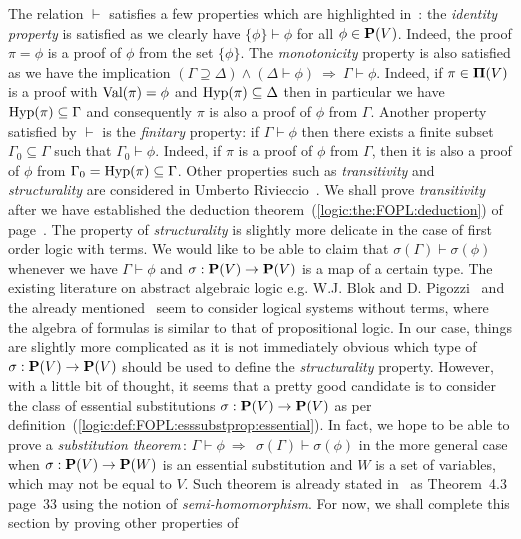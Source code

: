 The relation $\vdash$ satisfies a few properties which are
highlighted in~\cite{Rivieccio}: the {\em identity property} is
satisfied as we clearly have $\{\phi\}\vdash\phi$ for all
$\phi\in\mbox{${\bf P}(V)$}$. Indeed, the proof $\pi=\phi$ is a proof of $\phi$ from
the set $\{\phi\}$. The {\em monotonicity} property is also
satisfied as we have the implication
$(\Gamma\supseteq\Delta)\land(\Delta\vdash\phi)\ \Rightarrow\
\Gamma\vdash\phi$. Indeed, if $\pi\in\mbox{${\bf\Pi}(V)$}$ is a proof with
$\mbox{\rm Val}(\pi)=\phi$ and $\mbox{\rm Hyp}(\pi)\subseteq\Delta$ then in particular
we have $\mbox{\rm Hyp}(\pi)\subseteq\Gamma$ and consequently $\pi$ is also a
proof of $\phi$ from $\Gamma$. Another property satisfied by
$\vdash$ is the {\em finitary} property: if $\Gamma\vdash\phi$ then
there exists a finite subset $\Gamma_{0}\subseteq\Gamma$ such that
$\Gamma_{0}\vdash\phi$. Indeed, if $\pi$ is a proof of $\phi$ from
$\Gamma$, then it is also a proof of $\phi$ from
$\Gamma_{0}=\mbox{\rm Hyp}(\pi)\subseteq\Gamma$. Other properties such as {\em
transitivity} and {\em structurality} are considered in Umberto
Rivieccio~\cite{Rivieccio}. We shall prove {\em transitivity} after
we have established the deduction
theorem~(\ref{logic:the:FOPL:deduction}) of
page~\pageref{logic:the:FOPL:deduction}. The property of {\em
structurality} is slightly more delicate in the case of first order
logic with terms. We would like to be able to claim that
$\sigma(\Gamma)\vdash\sigma(\phi)$ whenever we have
$\Gamma\vdash\phi$ and $\sigma:\mbox{${\bf P}(V)$}\to\mbox{${\bf P}(V)$}$ is a map of a certain
type. The existing literature on abstract algebraic logic e.g. W.J.
Blok and D. Pigozzi~\cite{BlokPigozzi} and the already
mentioned~\cite{Rivieccio} seem to consider logical systems without
terms, where the algebra of formulas is similar to that of
propositional logic. In our case, things are slightly more
complicated as it is not immediately obvious which type of
$\sigma:\mbox{${\bf P}(V)$}\to\mbox{${\bf P}(V)$}$ should be used to define the {\em structurality}
property. However, with a little bit of thought, it seems that a
pretty good candidate is to consider the class of essential
substitutions $\sigma:\mbox{${\bf P}(V)$}\to\mbox{${\bf P}(V)$}$ as per
definition~(\ref{logic:def:FOPL:esssubstprop:essential}). In fact,
we hope to be able to prove a {\em substitution theorem}\,:
$\Gamma\vdash\phi\ \Rightarrow\ \ \sigma(\Gamma)\vdash\sigma(\phi)$
in the more general case when $\sigma:\mbox{${\bf P}(V)$}\to{\bf P}(W)$ is an
essential substitution and $W$ is a set of variables, which may not
be equal to $V$. Such theorem is already stated in~\cite{AlgLog} as
Theorem~4.3 page~33 using the notion of {\em semi-homomorphism}. For
now, we shall complete this section by proving other properties of
